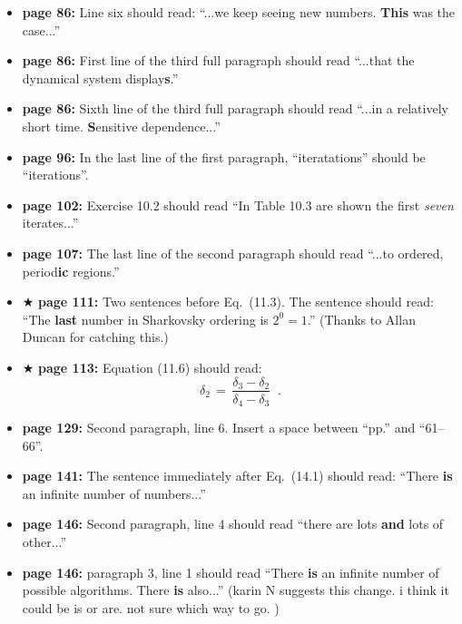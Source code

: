 \documentclass[12pt]{article}
\begin{document}
\begin{itemize}
  \item {\bf page 86:}  Line six should read: ``...we keep seeing new
    numbers.  {\bf This} was the case...'' 

  \item {\bf page 86:} First line of the third full paragraph should
    read ``...that the dynamical system display{\bf s}.''

  \item {\bf page 86:} Sixth line of the third full paragraph should
    read ``...in a relatively short time.  {\bf S}ensitive
    dependence...'' 

  \item {\bf page 96:}  In the last line of the first paragraph,
    ``iteratations'' should be ``iterations''.  %

  \item {\bf page 102:}  Exercise 10.2 should read ``In Table 10.3 are 
    shown the first {\em seven} iterates...''

  \item {\bf page 107:} The last line of the second paragraph should
    read ``...to ordered, period{\bf ic} regions.'' %

  \item $\bigstar$ {\bf page 111:}  Two sentences before Eq.~(11.3).  The
    sentence should read: ``The {\bf last} number in Sharkovsky
    ordering is $2^0 = 1$.''  (Thanks to Allan Duncan for catching
    this.) 

  \item $\bigstar$ {\bf page 113:}  Equation (11.6) should read:
$$
\delta_2 \, = \, \frac{ \delta_3 - \delta_2}{\delta_4 - \delta_3} \;\;.
$$

  \item {\bf page 129:}  Second paragraph, line 6.  Insert a space
    between ``pp.''  and ``61--66''.

  \item {\bf page 141:}  The sentence immediately after Eq.~(14.1)
    should read: ``There {\bf is} an infinite number of numbers...''

  \item {\bf page 146:}  Second paragraph, line 4 should read ``there
    are lots {\bf and} lots of other...'' %

  \item {\bf page 146:} paragraph 3, line 1 should read ``There {\bf
    is} an infinite number of possible algorithms.  There {\bf is}
    also...'' (karin N suggests this change.  i think it could be is
              or are.  not sure which way to go. )


\end{itemize}
\end{document}
